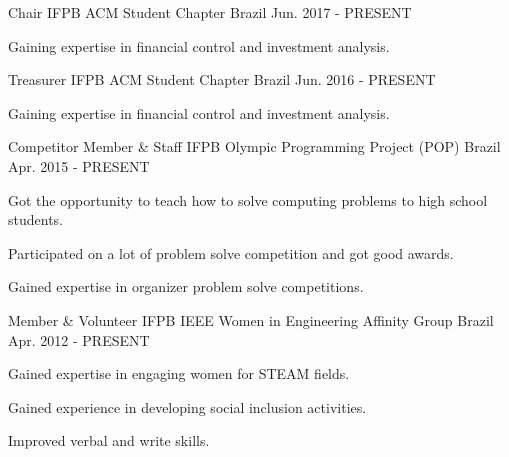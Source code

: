 

\begin{cventries}

  \cventry
    {Chair} %
    {IFPB ACM Student Chapter} %
    {Brazil} %
    {Jun. 2017 - PRESENT} %
    {
      \begin{cvitems} %
        \item {Gaining expertise in financial control and investment analysis.}
      \end{cvitems}
    }
    
  \cventry
    {Treasurer} %
    {IFPB ACM Student Chapter} %
    {Brazil} %
    {Jun. 2016 - PRESENT} %
    {
      \begin{cvitems} %
        \item {Gaining expertise in financial control and investment analysis.}
      \end{cvitems}
    }
    
  \cventry
    {Competitor Member \& Staff} %
    {IFPB Olympic Programming Project (POP)} %
    {Brazil} %
    {Apr. 2015 - PRESENT} %
    {
      \begin{cvitems} %
        \item {Got the opportunity to teach how to solve computing problems to high school students.}
        \item {Participated on a lot of problem solve competition and got good awards.}
        \item {Gained expertise in organizer problem solve competitions.}
      \end{cvitems}
    }

  \cventry
    {Member \& Volunteer} %
    {IFPB IEEE Women in Engineering Affinity Group} %
    {Brazil} %
    {Apr. 2012 - PRESENT} %
    {
      \begin{cvitems} %
        \item {Gained expertise in engaging women for STEAM fields.}
        \item {Gained experience in developing social inclusion activities.}
        \item {Improved verbal and write skills.}
      \end{cvitems}
    }


\end{cventries}
